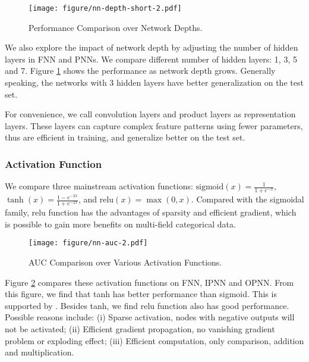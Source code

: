 \documentclass[conference]{IEEEtran}
\newcommand{\sigmoid}{\text{sigmoid}}
\newcommand{\relu}{\text{relu}}
\begin{document}
\begin{figure}[t]
	\centering
	\texttt{[image: figure/nn-depth-short-2.pdf]}
	\caption{Performance Comparison over Network Depths.}\label{fig:depth}
\end{figure}

We also explore the impact of network depth by adjusting the number of hidden layers in FNN and PNNs.
We compare different number of hidden layers: 1, 3, 5 and 7. Figure \ref{fig:depth} shows the performance as network depth grows. Generally speaking, the networks with 3 hidden layers have better generalization on the test set.


For convenience, we call convolution layers and product layers as representation layers.
These layers can capture complex feature patterns using fewer parameters, thus are efficient in training, and generalize better on the test set.



\subsubsection{Activation Function}
We compare three mainstream activation functions: $\sigmoid(x) = \frac{1}{1+e^{-x}}$, $\tanh(x) = \frac{1 - e^{-2x}}{1 + e^{-2x}}$, and $\relu(x) = \max(0, x)$.
Compared with the sigmoidal family, relu function has the advantages of sparsity and efficient gradient, which is possible to gain more benefits on multi-field categorical data.


\begin{figure}[t]
	\centering
	\texttt{[image: figure/nn-auc-2.pdf]}
	\caption{AUC Comparison over Various Activation Functions.}\label{fig:act}
\end{figure}

Figure \ref{fig:act} compares these activation functions on FNN, IPNN and OPNN. From this figure, we find that tanh has better performance than sigmoid. This is supported by \cite{zhang2016deep}.
Besides tanh, we find relu function also has good performance. Possible reasons include: (i) Sparse activation, nodes with negative outputs will not be activated; (ii) Efficient gradient propagation, no vanishing gradient problem or exploding effect; (iii) Efficient computation, only comparison, addition and multiplication.
\end{document}

